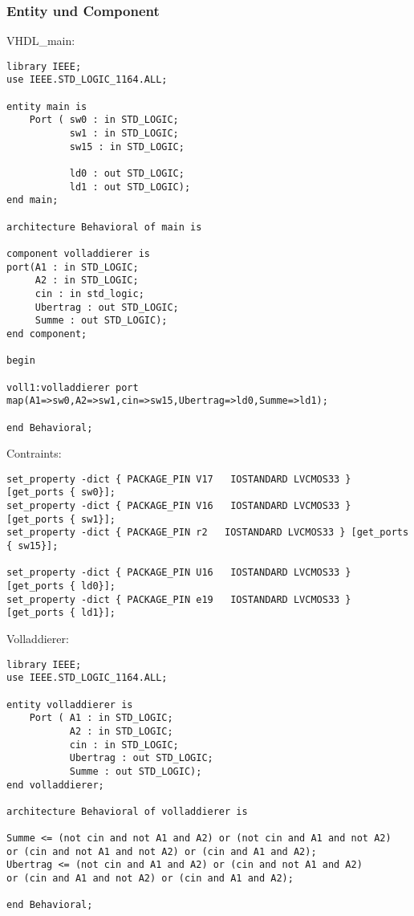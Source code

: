 \documentclass{article}
\begin{document}
\subsubsection{Entity und Component}
VHDL\_main:\newline
\begin{verbatim}
library IEEE;
use IEEE.STD_LOGIC_1164.ALL;

entity main is
    Port ( sw0 : in STD_LOGIC;
           sw1 : in STD_LOGIC;
           sw15 : in STD_LOGIC;

           ld0 : out STD_LOGIC;
           ld1 : out STD_LOGIC);
end main;

architecture Behavioral of main is

component volladdierer is
port(A1 : in STD_LOGIC;
     A2 : in STD_LOGIC;
     cin : in std_logic;
     Ubertrag : out STD_LOGIC;
     Summe : out STD_LOGIC);
end component;

begin

voll1:volladdierer port map(A1=>sw0,A2=>sw1,cin=>sw15,Ubertrag=>ld0,Summe=>ld1);

end Behavioral;
\end{verbatim}
Contraints:\newline
\begin{verbatim}
set_property -dict { PACKAGE_PIN V17   IOSTANDARD LVCMOS33 } [get_ports { sw0}];
set_property -dict { PACKAGE_PIN V16   IOSTANDARD LVCMOS33 } [get_ports { sw1}];
set_property -dict { PACKAGE_PIN r2   IOSTANDARD LVCMOS33 } [get_ports { sw15}];

set_property -dict { PACKAGE_PIN U16   IOSTANDARD LVCMOS33 } [get_ports { ld0}];
set_property -dict { PACKAGE_PIN e19   IOSTANDARD LVCMOS33 } [get_ports { ld1}];
\end{verbatim}
Volladdierer:\newline
\begin{verbatim}
library IEEE;
use IEEE.STD_LOGIC_1164.ALL;

entity volladdierer is
    Port ( A1 : in STD_LOGIC;
           A2 : in STD_LOGIC;
           cin : in STD_LOGIC;
           Ubertrag : out STD_LOGIC;
           Summe : out STD_LOGIC);
end volladdierer;

architecture Behavioral of volladdierer is

Summe <= (not cin and not A1 and A2) or (not cin and A1 and not A2) 
or (cin and not A1 and not A2) or (cin and A1 and A2);
Ubertrag <= (not cin and A1 and A2) or (cin and not A1 and A2) 
or (cin and A1 and not A2) or (cin and A1 and A2);

end Behavioral;
\end{verbatim}
\end{document}

